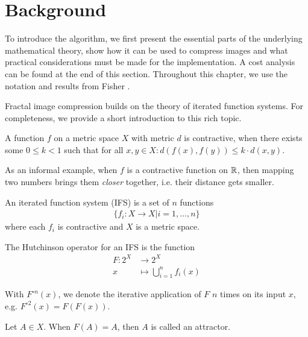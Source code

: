 \section{Background}\label{sec:background}

To introduce the algorithm, we first present the essential parts of the
underlying mathematical theory, show how it can be used to compress images and
what practical considerations must be made for the implementation. A cost
analysis can be found at the end of this section. Throughout this chapter, we
use the notation and results from Fisher \cite{fisher2012}.

 Fractal image compression builds on the
theory of iterated function systems. For completeness, we provide a short
introduction to this rich topic.

\begin{definition}
    A function $f$ on a metric space $X$ with metric $d$ is contractive, when there exists some $0 \leq k < 1$
    such that for all $x,y \in X: d(f(x), f(y)) \leq k \cdot d(x,y)$.
\end{definition}

As an informal example, when $f$ is a contractive function on $\mathbb{R}$, then mapping
two numbers brings them \textit{closer} together, i.e. their distance gets
smaller.

\begin{definition}
  An iterated function system (IFS) is a set of $n$ functions
  \begin{align*}
    \{f_i:X \to X | i=1,\ldots,n\}
  \end{align*}
  where each $f_i$ is contractive and $X$ is a metric space.
\end{definition}

\begin{definition}
    The Hutchinson operator for an IFS is the function
    \begin{align*}
        F \colon 2^X &\to 2^X\\
        x &\mapsto \bigcup_{i=1}^n f_i(x)
    \end{align*}
\end{definition}

With $F^{\circ n}(x)$, we denote the iterative application of $F$ $n$ times on
its input $x$, e.g. $F^{\circ 2}(x) = F(F(x))$.

\begin{definition}
    Let $A \in X$. When $F(A)=A$, then $A$ is called an attractor.
\end{definition}

